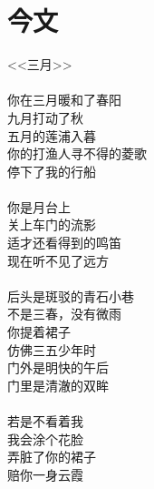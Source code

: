 \documentclass[12pt,a4paper]{article}
\begin{document}
\section*{今文}
\begin{center}
<<三月>>\\
\qquad\\
你在三月暖和了春阳\\
九月打动了秋\\
五月的莲浦入暮\\
你的打渔人寻不得的菱歌\\
停下了我的行船\\
\qquad\\
你是月台上\\
关上车门的流影\\
适才还看得到的鸣笛\\
现在听不见了远方\\
\qquad\\
后头是斑驳的青石小巷\\
不是三春，没有微雨\\
你提着裙子\\
仿佛三五少年时\\
门外是明快的午后\\
门里是清澈的双眸\\
\qquad\\
若是不看着我\\
我会涂个花脸\\
弄脏了你的裙子\\
赔你一身云霞\\
\end{center}
%
\end{document}
